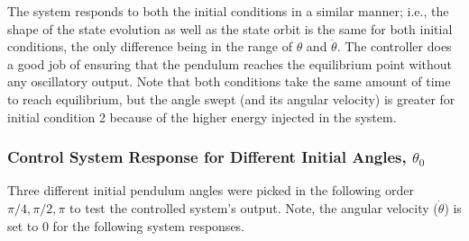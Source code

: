 \documentclass[10pt]{article}
\begin{document}
The system responds to both the initial conditions in a similar manner; i.e., the shape of the state evolution as well as the state orbit is the same for both initial conditions, the only difference being in the range of $\theta$ and $\dot{\theta}$. The controller does a good job of ensuring that the pendulum reaches the equilibrium point without any oscillatory output. Note that both conditions take the same amount of time to reach equilibrium, but the angle swept (and its angular velocity) is greater for initial condition 2 because of the higher energy injected in the system. 

\subsubsection{Control System Response for Different Initial Angles, \texorpdfstring{$\theta_0$}{}}
Three different initial pendulum angles were picked in the following order $\pi/4, \pi/2, \pi$ to test the controlled system's output. Note, the angular velocity ($\dot{\theta}$) is set to 0 for the following system responses.
\end{document}
